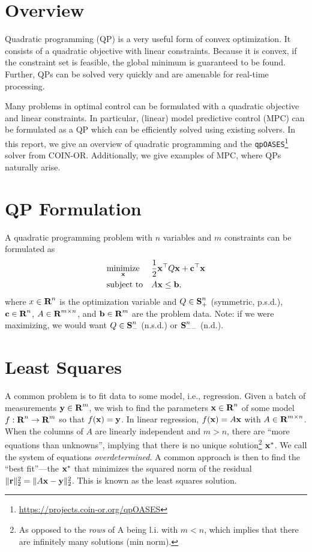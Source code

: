 \documentclass[10pt]{article}
\begin{document}
\section*{Overview}
Quadratic programming (QP) is a very useful form of convex optimization.
It consists of a quadratic objective with linear constraints.
Because it is convex, if the constraint set is feasible, the global minimum is guaranteed to be found.
Further, QPs can be solved very quickly and are amenable for real-time processing.

Many problems in optimal control can be formulated with a quadratic objective and linear constraints.
In particular, (linear) model predictive control (MPC) can be formulated as a QP which can be efficiently solved using existing solvers.
In this report, we give an overview of quadratic programming and the \texttt{qpOASES}\footnote{\url{https://projects.coin-or.org/qpOASES}} solver from COIN-OR.
Additionally, we give examples of MPC, where QPs naturally arise.

\section*{QP Formulation}
A quadratic programming problem with $n$ variables and $m$ constraints can be formulated as
\begin{equation}\label{eq:standard-qp}
\begin{aligned}
& \underset{\mathbf{x}}{\text{minimize}}
& & \frac{1}{2}\mathbf{x}^\top Q\mathbf{x} + \mathbf{c}^\top\mathbf{x} \\
& \text{subject to}
& & A\mathbf{x} \leq \mathbf{b},
\end{aligned}
\end{equation}
where $x\in{\mbox{\bf R}}^n$ is the optimization variable and $Q\in{\mbox{\bf S}}^n_+$ (symmetric, p.s.d.), $\mathbf{c}\in{\mbox{\bf R}}^n$, $A\in{\mbox{\bf R}}^{m\times n}$, and $\mathbf{b}\in{\mbox{\bf R}}^m$ are the problem data.
Note: if we were maximizing, we would want $Q\in{\mbox{\bf S}}^n_-$ (n.s.d.) or ${\mbox{\bf S}}^n_{--}$ (n.d.).

\section*{Least Squares}
A common problem is to fit data to some model, i.e., regression.
Given a batch of measurements $\mathbf{y}\in{\mbox{\bf R}}^m$, we wish to find the parameters $\mathbf{x}\in{\mbox{\bf R}}^n$ of some model $f:{\mbox{\bf R}}^n\to{\mbox{\bf R}}^m$ so that $f(\mathbf{x})=\mathbf{y}$.
In linear regression, $f(\mathbf{x})=A\mathbf{x}$ with $A\in{\mbox{\bf R}}^{m\times n}$.
When the columns of $A$ are linearly independent and $m>n$, there are ``more equations than unknowns'', implying that there is no unique solution\footnote{As opposed to the \textit{rows} of A being l.i. with $m<n$, which implies that there are infinitely many solutions (min norm).} $\mathbf{x}^*$.
We call the system of equations \textit{overdetermined}.
A common approach is then to find the ``best fit''---the $\mathbf{x}^*$ that minimizes the squared norm of the residual $\|\mathbf{r}\|^2_2=\|A\mathbf{x}-\mathbf{y}\|^2_2$.
This is known as the least squares solution.
\end{document}
